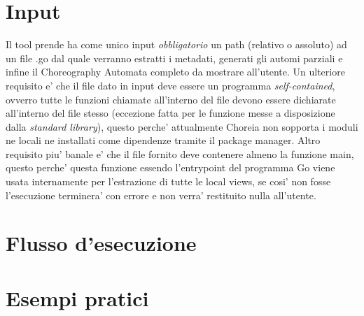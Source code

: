 \section{Input}
Il tool prende ha come unico input \emph{obbligatorio} un path (relativo o assoluto) ad un file .go dal quale verranno estratti i metadati, generati gli automi parziali e infine il Choreography Automata completo da mostrare all'utente. Un ulteriore requisito e' che il file dato in input deve essere un programma \emph{self-contained}, ovverro tutte le funzioni chiamate all'interno del file devono essere dichiarate all'interno del file stesso (eccezione fatta per le funzione messe a disposizione dalla \emph{standard library}), questo perche' attualmente Choreia non sopporta i moduli ne locali ne installati come dipendenze tramite il package manager. Altro requisito piu' banale e' che il file fornito deve contenere almeno la funzione main, questo perche' questa funzione essendo l'entrypoint del programma Go viene usata internamente per l'estrazione di tutte le local views, se cosi' non fosse l'esecuzione terminera' con errore e non verra' restituito nulla all'utente.

\section{Flusso d'esecuzione}

\section{Esempi pratici}